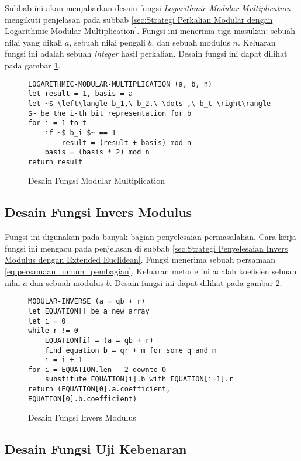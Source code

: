 Subbab ini akan menjabarkan desain fungsi \textit{Logarithmic Modular Multiplication} mengikuti penjelasan pada subbab \ref{sec:Strategi Perkalian Modular dengan Logarithmic Modular Multiplication}. Fungsi ini menerima tiga masukan: sebuah nilai yang dikali $ a $, sebuah nilai pengali $ b $, dan sebuah modulus $ n $. Keluaran fungsi ini adalah sebuah \textit{integer} hasil perkalian. Desain fungsi ini dapat dilihat pada gambar \ref{psdo:modmul}.
\begin{figure}[h!]
\begin{lstlisting}[firstnumber=0]
LOGARITHMIC-MODULAR-MULTIPLICATION (a, b, n)
let result = 1, basis = a
let ~$ \left\langle b_1,\ b_2,\ \dots ,\ b_t \right\rangle $~ be the i-th bit representation for b
for i = 1 to t
	if ~$ b_i $~ == 1
		result = (result + basis) mod n
	basis = (basis * 2) mod n
return result
\end{lstlisting}
\caption{Desain Fungsi Modular Multiplication}
\label{psdo:modmul}
\end{figure}

\subsection{Desain Fungsi Invers Modulus}

Fungsi ini digunakan pada banyak bagian penyelesaian permasalahan. Cara kerja fungsi ini mengacu pada penjelasan di subbab \ref{sec:Strategi Penyelesaian Invers Modulus dengan Extended Euclidean}. Fungsi menerima sebuah persamaan \ref{eq:persamaan_umum_pembagian}. Keluaran metode ini adalah koefisien sebuah nilai $ a $ dan sebuah modulus $ b $. Desain fungsi ini dapat dilihat pada gambar \ref{psdo:modinv}.
\begin{figure}[h!]
\begin{lstlisting}[firstnumber=0]
MODULAR-INVERSE (a = qb + r)
let EQUATION[] be a new array
let i = 0
while r != 0
	EQUATION[i] = (a = qb + r)
	find equation b = qr + m for some q and m
	i = i + 1
for i = EQUATION.len – 2 downto 0
	substitute EQUATION[i].b with EQUATION[i+1].r
return (EQUATION[0].a.coefficient, EQUATION[0].b.coefficient)
\end{lstlisting}
\caption{Desain Fungsi Invers Modulus}
\label{psdo:modinv}
\end{figure}

\subsection{Desain Fungsi Uji Kebenaran}


